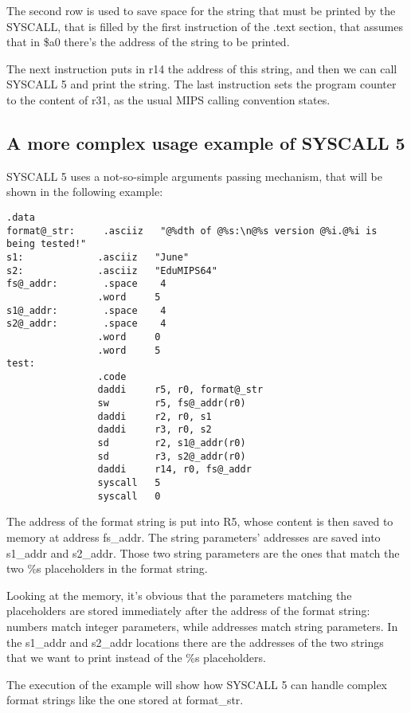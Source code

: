 \documentclass[letterpaper,10pt,english]{sphinxmanual}
\begin{document}
The second row is used to save space for the string that must be printed by the
SYSCALL, that is filled by the first instruction of the .text section, that
assumes that in \$a0 there's the address of the string to be printed.

The next instruction puts in r14 the address of this string, and then we can
call SYSCALL 5 and print the string. The last instruction sets the program counter
to the content of r31, as the usual MIPS calling convention states.


\subsection{A more complex usage example of SYSCALL 5}
\label{examples:a-more-complex-usage-example-of-syscall-5}
SYSCALL 5 uses a not-so-simple arguments passing mechanism, that will be shown in
the following example:

\begin{Verbatim}[commandchars=@\[\]]
                .data
format@_str:     .asciiz   "@%dth of @%s:\n@%s version @%i.@%i is being tested!"
s1:             .asciiz   "June"
s2:             .asciiz   "EduMIPS64"
fs@_addr:        .space    4
                .word     5
s1@_addr:        .space    4
s2@_addr:        .space    4
                .word     0
                .word     5
test:
                .code
                daddi     r5, r0, format@_str
                sw        r5, fs@_addr(r0)
                daddi     r2, r0, s1
                daddi     r3, r0, s2
                sd        r2, s1@_addr(r0)
                sd        r3, s2@_addr(r0)
                daddi     r14, r0, fs@_addr
                syscall   5
                syscall   0
\end{Verbatim}

The address of the format string is put into R5, whose content is then saved to
memory at address fs\_addr. The string parameters' addresses are saved into
s1\_addr and s2\_addr. Those two string parameters are the ones that match the
two \%s placeholders in the format string.

Looking at the memory, it's obvious that the parameters matching the
placeholders are stored immediately after the address of the format string:
numbers match integer parameters, while addresses match string parameters. In
the s1\_addr and s2\_addr locations there are the addresses of the two strings
that we want to print instead of the \%s placeholders.

The execution of the example will show how SYSCALL 5 can handle complex format
strings like the one stored at format\_str.



\renewcommand{\indexname}{Index}
\printindex
\end{document}
